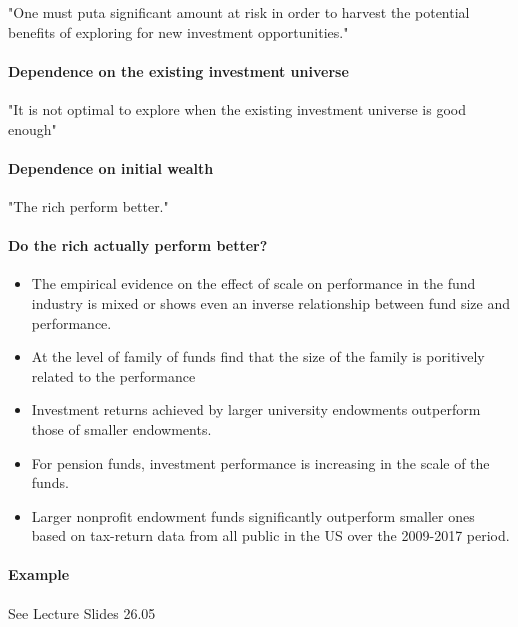 "One must puta significant amount at risk in order to harvest the potential
benefits of exploring for new investment opportunities."

\paragraph{Dependence on the existing investment universe}
"It is not optimal to explore when the existing investment universe is good
enough"

\paragraph{Dependence on initial wealth}
"The rich perform better."

\paragraph{Do the rich actually perform better?}
\begin{itemize}
    \item The empirical evidence on the effect of scale on performance in the
        fund industry is mixed or shows even an inverse relationship between
        fund size and performance.
    \item At the level of family of funds find that the size of the family is
        poritively related to the performance
    \item Investment returns achieved by larger university endowments outperform
        those of smaller endowments.
    \item For pension funds, investment performance is increasing in the scale
        of the funds.
    \item Larger nonprofit endowment funds significantly outperform smaller ones
        based on tax-return data from all public in the US over the 2009-2017
        period.
\end{itemize}

\paragraph{Example}
See Lecture Slides 26.05

